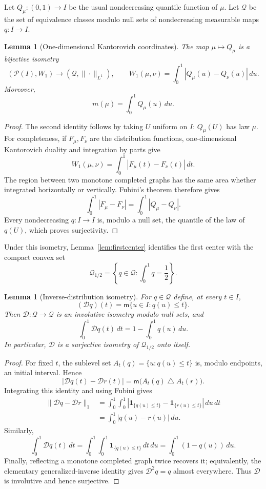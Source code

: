 \documentclass[11pt]{article}
\newtheorem{lemma}[theorem]{Lemma}
\newcommand{\Prob}{\mathcal P}
\newcommand{\Leb}{\mathsf m}
\newcommand{\Q}{\mathcal Q}
\newcommand{\D}{\mathcal D}
\newcommand{\W}{W_1}
\begin{document}
Let $Q_\mu:(0,1)\to I$ be the usual nondecreasing quantile function of
$\mu$.  Let $\Q$ be the set of equivalence classes modulo null sets of
nondecreasing measurable maps $q:I\to I$.

\begin{lemma}[One-dimensional Kantorovich coordinates]\label{lem:quantile}
The map $\mu\mapsto Q_\mu$ is a bijective isometry
\[
 (\Prob(I),\W)\longrightarrow(\Q,\|\cdot\|_{L^1}),
 \qquad
 \W(\mu,\nu)=\int_0^1|Q_\mu(u)-Q_\nu(u)|\,du.
\]
Moreover,
\[
 m(\mu)=\int_0^1Q_\mu(u)\,du.
\]
\end{lemma}

\begin{proof}
The second identity follows by taking $U$ uniform on $I$: $Q_\mu(U)$ has
law $\mu$.  For completeness, if $F_\mu,F_\nu$ are the distribution
functions, one-dimensional Kantorovich duality and integration by parts give
\[
 \W(\mu,\nu)=\int_0^1|F_\mu(t)-F_\nu(t)|\,dt.
\]
The region between two monotone completed graphs has the same area whether
integrated horizontally or vertically.  Fubini's theorem therefore gives
\[
 \int_0^1|F_\mu-F_\nu|=\int_0^1|Q_\mu-Q_\nu|.
\]
Every nondecreasing $q:I\to I$ is, modulo a null set, the quantile of the
law of $q(U)$, which proves surjectivity.
\end{proof}

Under this isometry, Lemma~\ref{lem:firstcenter} identifies the first center
with the compact convex set
\[
 \Q_{1/2}=\left\{q\in\Q:\int_0^1q=\frac12\right\}.
\]

\begin{lemma}[Inverse-distribution isometry]\label{lem:D}
For $q\in\Q$ define, at every $t\in I$,
\[
 (\D q)(t)=\Leb\{u\in I:q(u)\leq t\}.
\]
Then $\D:\Q\to\Q$ is an involutive isometry modulo null sets, and
\[
 \int_0^1\D q(t)\,dt=1-\int_0^1q(u)\,du.
\]
In particular, $\D$ is a surjective isometry of $\Q_{1/2}$ onto itself.
\end{lemma}

\begin{proof}
For fixed $t$, the sublevel set
$A_t(q)=\{u:q(u)\leq t\}$ is, modulo endpoints, an initial interval.
Hence
\[
 |\D q(t)-\D r(t)|=\Leb\bigl(A_t(q)\mathbin{\triangle}A_t(r)\bigr).
\]
Integrating this identity and using Fubini gives
\begin{align*}
 \|\D q-\D r\|_1
 &=\int_0^1\!\int_0^1
   \left|\mathbf1_{\{q(u)\leq t\}}-
          \mathbf1_{\{r(u)\leq t\}}\right|\,du\,dt\\
 &=\int_0^1|q(u)-r(u)|\,du.
\end{align*}
Similarly,
\[
 \int_0^1\D q(t)\,dt
 =\int_0^1\!\int_0^1\mathbf1_{\{q(u)\leq t\}}\,dt\,du
 =\int_0^1(1-q(u))\,du.
\]
Finally, reflecting a monotone completed graph twice recovers it; equivalently,
the elementary generalized-inverse identity gives $\D^2q=q$ almost
everywhere.  Thus $\D$ is involutive and hence surjective.
\end{proof}
\end{document}
